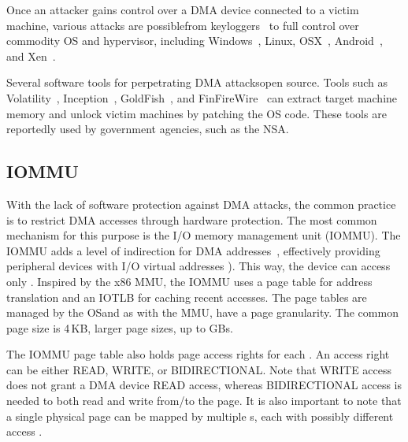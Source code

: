 Once an attacker gains control over a DMA device connected to a victim machine, various attacks are possible\DIFdelbegin {}\DIFdelend \DIFaddbegin {}\DIFaddend from keyloggers~\cite{LKV13, SB12} to full control over commodity OS and hypervisor, including Windows~\cite{AD10,thunder}, Linux, OSX~\cite{Fri16, thunder}, Android~\cite{Ben17b}, and Xen~\cite{Woj08}.

Several software tools \DIFaddbegin {}\DIFaddend for perpetrating DMA attacks\DIFdelbegin {}\DIFdelend \DIFaddbegin {}\DIFaddend open source. Tools such as Volatility~\cite{Vol}, Inception~\cite{MM}, GoldFish~\cite{GA10}, and FinFireWire~\cite{Fin14} can extract target machine memory and unlock victim machines by patching the OS code. These tools are reportedly used by government agencies, such as the NSA.

\subsection{IOMMU}

With the lack of software protection against DMA attacks, the common practice is to restrict DMA accesses through hardware protection. The most common mechanism for this purpose is the I/O memory management unit (IOMMU). The IOMMU adds a level of indirection for DMA addresses~\cite{WRC08,YZ15,SB12,MTF12}, effectively providing peripheral devices with \DIFdelbegin {}%
\DIFdel{(}\DIFdelend I/O virtual addresses \DIFaddbegin \DIFadd{(}\iova{}\DIFaddend ). This way, the device can access only \DIFdelbegin {}\DIFdelend \DIFaddbegin {}\DIFaddend . Inspired by the x86 MMU, the IOMMU uses a page table for address translation and an IOTLB for caching recent accesses.  The page tables are managed by the OS\DIFaddbegin \DIFadd{, }\DIFaddend and as with the MMU, have a page granularity. The common page size is 4\,KB, \DIFdelbegin {}\DIFdelend \DIFaddbegin {}\DIFaddend larger page sizes, up to GBs\DIFdelbegin {}\DIFdelend .

The IOMMU page table also holds page access rights for each \iova. An access right can be either READ, WRITE, or BIDIRECTIONAL. Note that WRITE access does not grant a DMA device READ access, whereas BIDIRECTIONAL access is needed to both read and write from/to the page. It is also important to note that a single physical page can be mapped by multiple \iova{}s, each with \DIFdelbegin {}\DIFdelend possibly different access \DIFdelbegin {}\DIFdelend \DIFaddbegin {}\DIFaddend .

